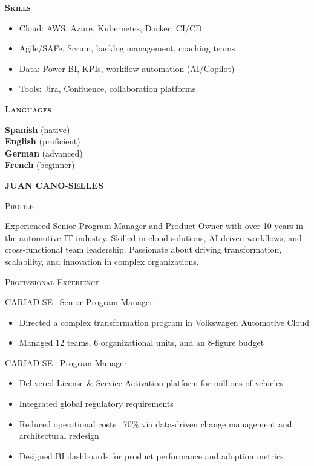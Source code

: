\documentclass[11pt, a4paper]{article}
\newcommand{\headleft}[1]{\vspace*{2ex}\textsc{\textbf{\color{softwhite}#1}}\par%
  \vspace*{-1.2ex}{\color{softwhite}\hrulefill}\par\vspace*{0.7ex}}
\newcommand{\headright}[1]{\vspace*{2ex}\textsc{\large\color{cvblue}#1}\par%
  \vspace*{-1.4ex}{\color{cvblue}\hrulefill}\par}
\newlength{\SideBarW}
\newlength{\BetweenJobsGap}     %
\newenvironment{job}[3]{%
  \vspace{\BetweenJobsGap}%
  \noindent\textsc{#1} \textemdash\ #2\hfill
  \begin{itemize}[leftmargin=1.4em,label=--,labelsep=0.5em,itemsep=0.45ex,topsep=0.2ex]
}{%
  \end{itemize}%
}
\begin{document}
\begin{minipage}{\textwidth}
{{\begin{minipage}[t]{\dimexpr\linewidth-8mm\relax}
      \headleft{Skills}
      \begin{itemize}[leftmargin=*, itemsep=0.5ex]
        \item Cloud: AWS, Azure, Kubernetes, Docker, CI/CD
        \item Agile/SAFe, Scrum, backlog management, coaching teams
        \item Data: Power BI, KPIs, workflow automation (AI/Copilot)
        \item Tools: Jira, Confluence, collaboration platforms
      \end{itemize}

      \headleft{Languages}
      \textbf{Spanish} (native) \\[0.5ex]
      \textbf{English} (proficient) \\[0.5ex]
      \textbf{German} (advanced) \\[0.5ex]
      \textbf{French} (beginner)
    \end{minipage}
  }%
}%
\hspace{3mm}%
\begin{minipage}[t]{\dimexpr\textwidth-\SideBarW-3mm\relax}
  \setlength{\parskip}{0.8ex}
  \setlength{\leftskip}{4mm}
  \setlength{\rightskip}{6mm}

  \vspace*{6mm}
  {\fontsize{28}{30}\sffont\bfseries\MakeUppercase{\textcolor{cvblue}{Juan Cano-Selles}}}\par
  \vspace*{1.0ex}

  \headright{Profile}
  Experienced Senior Program Manager and Product Owner with over 10 years in the automotive IT industry. Skilled in cloud solutions, AI-driven workflows, and cross-functional team leadership. Passionate about driving transformation, scalability, and innovation in complex organizations.

  \headright{Professional Experience}

  \begin{job}{CARIAD SE}{Senior Program Manager}{Mar 2024 -- Sep 2025}
    \item Directed a complex transformation program in Volkswagen Automotive Cloud
    \item Managed 12 teams, 6 organizational units, and an 8-figure budget
  \end{job}

  \begin{job}{CARIAD SE}{Program Manager}{Nov 2020 -- Mar 2024}
    \item Delivered License \& Service Activation platform for millions of vehicles
    \item Integrated global regulatory requirements
    \item Reduced operational costs ~70\% via data-driven change management and architectural redesign
    \item Designed BI dashboards for product performance and adoption metrics
  \end{job}


\end{minipage}
\end{minipage}
\end{document}
